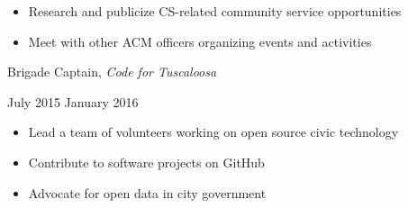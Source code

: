 \documentclass[11pt]{article}
\begin{document}
\begin{itemize}
  \item Research and publicize CS-related community service opportunities
  \item Meet with other ACM officers organizing events and activities
\end{itemize}

\begin{minipage}[t]{0.65\textwidth}
\flushleft
Brigade Captain, \textit{Code for Tuscaloosa}\\
\end{minipage}
\begin{minipage}[t]{0.30\textwidth}
\flushright
July 2015 \space \textemdash \space January 2016\\
\end{minipage}

\begin{itemize}
  \item Lead a team of volunteers working on open source civic technology
  \item Contribute to software projects on GitHub
  \item Advocate for open data in city government
\end{itemize}
\end{document}
